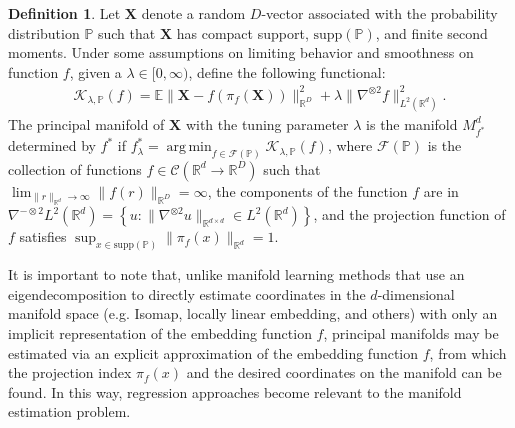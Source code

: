 \documentclass[12pt]{article}
\DeclareMathOperator*{\argmin}{arg\,min}
\theoremstyle{definition}
\newtheorem{definition}{Definition}
\begin{document}
\begin{definition}
  \label{def:principal_manifolds}
  Let $\mathbf{X}$ denote a random $D$-vector associated with the probability distribution $\mathbb{P}$ such that $\mathbf{X}$ has compact support, $\text{supp}(\mathbb{P})$, and finite second moments. Under some assumptions on limiting behavior and smoothness on function $f$, given a $\lambda \in [0, \infty)$, define the following functional:
  \begin{align}\label{eq:pme_kappa}
\mathcal{K}_{\lambda, \mathbb{P}}(f) = \mathbb{E}\|\mathbf{X} - f(\pi_f(\mathbf{X}))\|_{\mathbb{R}^{D}}^2 + \lambda\|\nabla^{\otimes 2}f\|_{L^2(\mathbb{R}^{d})}^2. 
  \end{align}
  The principal manifold of $\mathbf{X}$ with the tuning parameter $\lambda$ is the manifold $M_{f^{*}}^{d}$ determined by $f^{*}$ if
  $f_{\lambda}^{*} = \argmin_{f \in \mathcal{F}(\mathbb{P})}\mathcal{K}_{\lambda, \mathbb{P}}(f)$,
where $\mathcal{F}(\mathbb{P})$ is the collection of functions $f \in \mathcal{C}(\mathbb{R}^{d} \to \mathbb{R}^{D})$ such that $\lim_{\|r\|_{\mathbb{R}^{d}} \to \infty}\|f(r)\|_{\mathbb{R}^{D}} = \infty$, the components of the function $f$ are in $\nabla^{-\otimes 2}L^2(\mathbb{R}^{d}) = \left\{u : \|\nabla^{\otimes 2} u\|_{\mathbb{R}^{d \times d}} \in L^2(\mathbb{R}^{d})\right\}$, and the projection function of $f$ satisfies $\sup_{x \in \text{supp}(\mathbb{P})}\|\pi_f(x)\|_{\mathbb{R}^{d}} = 1$.
\end{definition}

It is important to note that, unlike manifold learning methods that use an eigendecomposition to directly estimate coordinates in the $d$-dimensional manifold space (e.g. Isomap, locally linear embedding, and others) with only an implicit representation of the embedding function $f$, principal manifolds may be estimated via an explicit approximation of the embedding function $f$, from which the projection index $\pi_f(x)$ and the desired coordinates on the manifold can be found. In this way, regression approaches become relevant to the manifold estimation problem.
\end{document}
